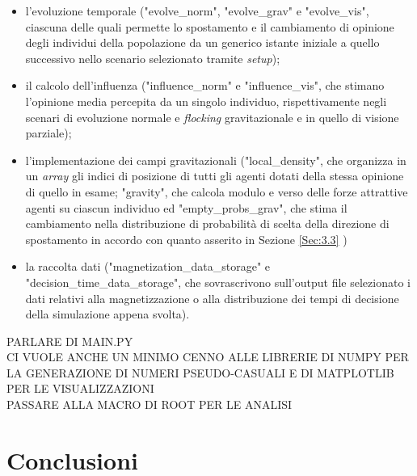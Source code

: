 \documentclass[letterpaper,10pt]{article}
\begin{document}
\begin{itemize}
  \item l'evoluzione temporale ("evolve\_norm", "evolve\_grav" e "evolve\_vis", ciascuna delle quali permette lo spostamento e il cambiamento di opinione degli individui della popolazione da un generico istante iniziale a quello successivo nello scenario selezionato tramite \textit{setup});
  \item il calcolo dell'influenza ("influence\_norm" e "influence\_vis", che stimano l'opinione media percepita da un singolo individuo, rispettivamente negli scenari di evoluzione normale e \textit{flocking} gravitazionale e in quello di visione parziale);
  \item l'implementazione dei campi gravitazionali ("local\_density", che organizza in un \textit{array} gli indici di posizione di tutti gli agenti dotati della stessa opinione di quello in esame; "gravity", che calcola modulo e verso delle forze attrattive agenti su ciascun individuo ed "empty\_probs\_grav", che stima il cambiamento nella distribuzione di probabilità di scelta della direzione di spostamento in accordo con quanto asserito in Sezione \ref{Sec:3.3} )
  \item la raccolta dati ("magnetization\_data\_storage" e "decision\_time\_data\_storage", che sovrascrivono sull'output file selezionato i dati relativi alla magnetizzazione o alla distribuzione dei tempi di decisione della simulazione appena svolta).
\end{itemize}

PARLARE DI MAIN.PY
\\CI VUOLE ANCHE UN MINIMO CENNO ALLE LIBRERIE DI NUMPY PER LA GENERAZIONE DI NUMERI PSEUDO-CASUALI E DI MATPLOTLIB PER LE VISUALIZZAZIONI
\\PASSARE ALLA MACRO DI ROOT PER LE ANALISI


\section{Conclusioni}
\end{document}
